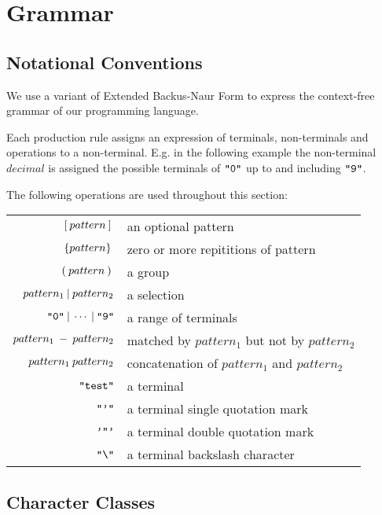 \section{Grammar}

\subsection{Notational Conventions}
We use a variant of Extended Backus-Naur Form to express the context-free grammar of
our programming language.

Each production rule assigns an expression of terminals, non-terminals and operations
to a non-terminal. E.g. in the following example the non-terminal $decimal$ is assigned
the possible terminals of $\texttt{"0"}$ up to and including $\texttt{"9"}$.

\begin{ebnf}
\end{ebnf}

The following operations are used throughout this section:
\begin{center}
\begin{tabular}{r l}
  $[\: pattern \:] \:$ & an optional pattern \\
  $\{pattern\} \:$ & zero or more repititions of pattern \\
  $(\: pattern \:) \:$ & a group \\
  $pattern_1 \: | \: pattern_2$ & a selection \\
  $\texttt{"0"} \: | \: \cdots \: | \: \texttt{"9"}$ & a range of terminals \\
  $pattern_1 \: - \: pattern_2$ & matched by $pattern_1$ but not by $pattern_2$\\
  $pattern_1 \: pattern_2$ & concatenation of $pattern_1$ and $pattern_2$ \\
  $\texttt{"test"}$ & a terminal \\
  $\texttt{"'"}$ & a terminal single quotation mark \\
  $\texttt{'"'}$ & a terminal double quotation mark \\
  $\texttt{"\textbackslash"}$ & a terminal backslash character \\
\end{tabular}
\end{center}


\subsection{Character Classes}
\begin{ebnf}
\end{ebnf}
